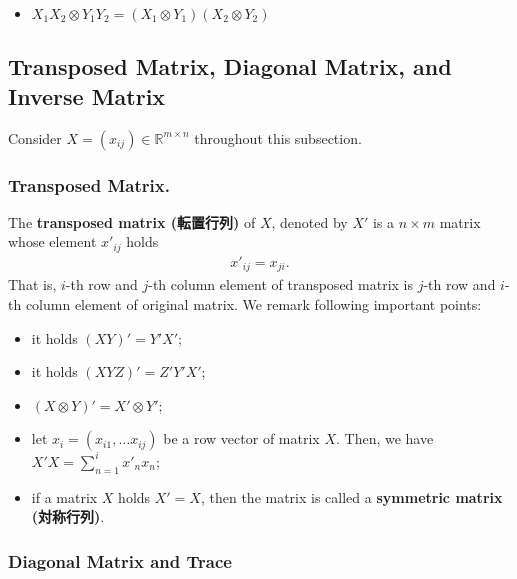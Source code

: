 \documentclass[
  12pt,
]{article}
\providecommand{\tightlist}{%
  \setlength{\itemsep}{0pt}\setlength{\parskip}{0pt}}
\begin{document}
\begin{itemize}
\tightlist
\item
  \(X_{1}X_{2} \otimes Y_{1}Y_{2} = (X_{1} \otimes Y_{1})(X_{2} \otimes Y_{2})\)
\end{itemize}

\hypertarget{transposed-matrix-diagonal-matrix-and-inverse-matrix}{%
\subsection{Transposed Matrix, Diagonal Matrix, and Inverse
Matrix}\label{transposed-matrix-diagonal-matrix-and-inverse-matrix}}

Consider \(X = (x_{ij}) \in \mathbb{R}^{m \times n}\) throughout this
subsection.

\hypertarget{transposed-matrix.}{%
\subsubsection{Transposed Matrix.}\label{transposed-matrix.}}

The \textbf{transposed matrix (転置行列)} of \(X\), denoted by \(X'\) is
a \(n \times m\) matrix whose element \(x'_{ij}\) holds \begin{align*}
  x'_{ij} = x_{ji}.
\end{align*} That is, \(i\)-th row and \(j\)-th column element of
transposed matrix is \(j\)-th row and \(i\)-th column element of
original matrix. We remark following important points:

\begin{itemize}
\tightlist
\item
  it holds \((XY)' = Y'X'\);
\item
  it holds \((XYZ)' = Z'Y'X'\);
\item
  \((X \otimes Y)' = X' \otimes Y'\);
\item
  let \(x_i = (x_{i1}, \ldots x_{ij})\) be a row vector of matrix \(X\).
  Then, we have \(X'X = \sum_{n = 1}^i x'_n x_n\);
\item
  if a matrix \(X\) holds \(X' = X\), then the matrix is called a
  \textbf{symmetric matrix (対称行列)}.
\end{itemize}

\hypertarget{diagonal-matrix-and-trace}{%
\subsubsection{Diagonal Matrix and
Trace}\label{diagonal-matrix-and-trace}}
\end{document}
